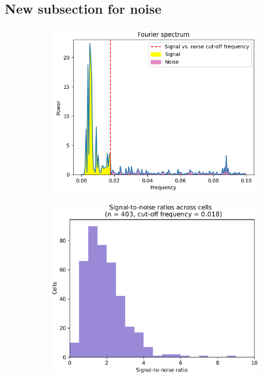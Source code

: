 

\subsection{New subsection for noise}
\label{subsec:analysis-characterisation-noise}

\begin{figure}
  \centering
  \begin{subfigure}[htpb]{0.5\textwidth}
   \centering
   \includegraphics[width=\textwidth]{snr_illustration}
   \caption{
   }
   \label{fig:analysis-snr-illustration}
 \end{subfigure}%
 \begin{subfigure}[htpb]{0.5\textwidth}
   \centering
   \includegraphics[width=\textwidth]{pyruvate_snr_edit}
   \caption{
   }
   \label{fig:analysis-snr-histogram-example}
  \end{subfigure}


\end{figure}
